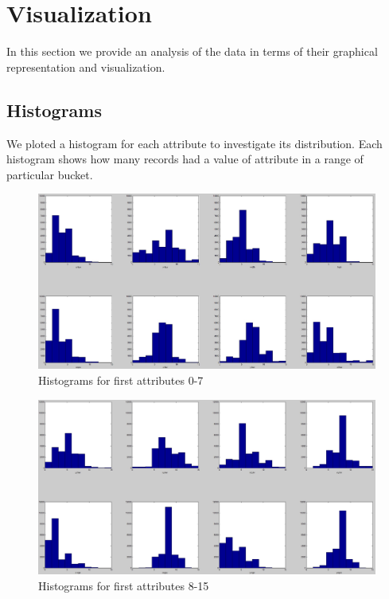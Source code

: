 \chapter*{Visualization}
In this section we provide an analysis of the data in terms of their
graphical representation and visualization.\\

\section*{Histograms}
We ploted a histogram for each attribute to investigate its distribution. 
Each histogram shows how many records had a value of attribute in a range
of particular bucket.

\begin{figure}[!tbh]
	\centering
	\includegraphics[width=1\textwidth]{figures/histograms_1}
	\caption{Histograms for first attributes 0-7}
	\label{fig:histograms_1}
\end{figure}

\begin{figure}[!tbh]
	\centering
	\includegraphics[width=1\textwidth]{figures/histograms_2}
	\caption{Histograms for first attributes 8-15}
	\label{fig:histograms_2}
\end{figure}

